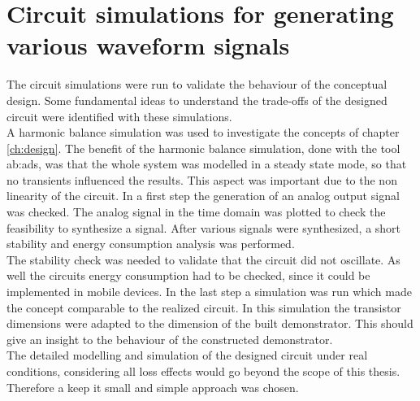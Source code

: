 \chapter{Circuit simulations for generating various waveform signals}
The circuit simulations were run to validate the behaviour of the conceptual design. Some fundamental ideas to understand the trade-offs of the designed circuit were identified with these simulations.\\
A harmonic balance simulation was used to investigate the concepts of chapter \ref{ch:design}.
The benefit of the harmonic balance simulation, done with the tool \gls{ab:ads}, was that the whole system was modelled in a steady state mode, so that no transients influenced the results.
This aspect was important due to the non linearity of the circuit.
In a first step the generation of an analog output signal was checked.
The analog signal in the time domain was plotted to check the feasibility to synthesize a signal.
After various signals were synthesized, a short stability and energy consumption analysis was performed.\\
The stability check was needed to validate that the circuit did not oscillate.
As well the circuits energy consumption had to be checked, since it could be implemented in mobile devices.
In the last step a simulation was run which made the concept comparable to the realized circuit. 
In this simulation the transistor dimensions were adapted to the dimension of the built demonstrator. 
This should give an insight to the behaviour of the constructed demonstrator.\\
The detailed modelling and simulation of the designed circuit under real conditions, considering all loss effects would go beyond the scope of this thesis. Therefore a keep it small and simple approach was chosen.\\   

